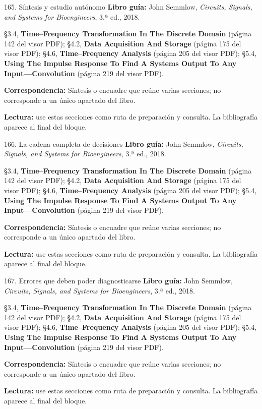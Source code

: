 \documentclass[
  10pt,
  ignorenonframetext,
  aspectratio=169,
  spanish,
]{beamer}
\begin{document}
\begin{frame}{165. Síntesis y estudio autónomo}
\label{suxedntesis-y-estudio-autuxf3nomo-1}
\textbf{Libro guía:} John Semmlow, \emph{Circuits, Signals, and Systems
for Bioengineers}, 3.ª ed., 2018.

§3.4, \textbf{Time--Frequency Transformation In The Discrete Domain}
(página 142 del visor PDF); §4.2, \textbf{Data Acquisition And Storage}
(página 175 del visor PDF); §4.6, \textbf{Time--Frequency Analysis}
(página 205 del visor PDF); §5.4, \textbf{Using The Impulse Response To
Find A Systems Output To Any Input---Convolution} (página 219 del visor
PDF).

\textbf{Correspondencia:} Síntesis o encuadre que reúne varias
secciones; no corresponde a un único apartado del libro.

\textbf{Lectura:} use estas secciones como ruta de preparación y
consulta. La bibliografía aparece al final del bloque.
\end{frame}

\begin{frame}{166. La cadena completa de decisiones}
\label{la-cadena-completa-de-decisiones}
\textbf{Libro guía:} John Semmlow, \emph{Circuits, Signals, and Systems
for Bioengineers}, 3.ª ed., 2018.

§3.4, \textbf{Time--Frequency Transformation In The Discrete Domain}
(página 142 del visor PDF); §4.2, \textbf{Data Acquisition And Storage}
(página 175 del visor PDF); §4.6, \textbf{Time--Frequency Analysis}
(página 205 del visor PDF); §5.4, \textbf{Using The Impulse Response To
Find A Systems Output To Any Input---Convolution} (página 219 del visor
PDF).

\textbf{Correspondencia:} Síntesis o encuadre que reúne varias
secciones; no corresponde a un único apartado del libro.

\textbf{Lectura:} use estas secciones como ruta de preparación y
consulta. La bibliografía aparece al final del bloque.
\end{frame}

\begin{frame}{167. Errores que deben poder diagnosticarse}
\label{errores-que-deben-poder-diagnosticarse}
\textbf{Libro guía:} John Semmlow, \emph{Circuits, Signals, and Systems
for Bioengineers}, 3.ª ed., 2018.

§3.4, \textbf{Time--Frequency Transformation In The Discrete Domain}
(página 142 del visor PDF); §4.2, \textbf{Data Acquisition And Storage}
(página 175 del visor PDF); §4.6, \textbf{Time--Frequency Analysis}
(página 205 del visor PDF); §5.4, \textbf{Using The Impulse Response To
Find A Systems Output To Any Input---Convolution} (página 219 del visor
PDF).

\textbf{Correspondencia:} Síntesis o encuadre que reúne varias
secciones; no corresponde a un único apartado del libro.

\textbf{Lectura:} use estas secciones como ruta de preparación y
consulta. La bibliografía aparece al final del bloque.
\end{frame}
\end{document}

